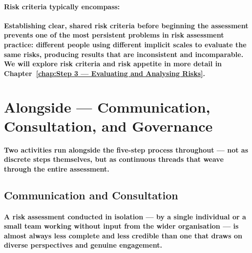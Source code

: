 \paragraph{Risk criteria typically encompass:}
\begin{itemize}
\end{itemize}
\paragraph{Establishing clear, shared risk criteria before beginning the assessment prevents one of the most persistent problems in risk assessment practice: different people using different implicit scales to evaluate the same risks, producing results that are inconsistent and incomparable. We will explore risk criteria and risk appetite in more detail in Chapter~\ref{chap:Step 3 — Evaluating and Analysing Risks}.}

\section{Alongside — Communication, Consultation, and Governance}
\paragraph{Two activities run alongside the five-step process throughout — not as discrete steps themselves, but as continuous threads that weave through the entire assessment.}

\subsection{Communication and Consultation}
\paragraph{A risk assessment conducted in isolation — by a single individual or a small team working without input from the wider organisation — is almost always less complete and less credible than one that draws on diverse perspectives and genuine engagement.}

